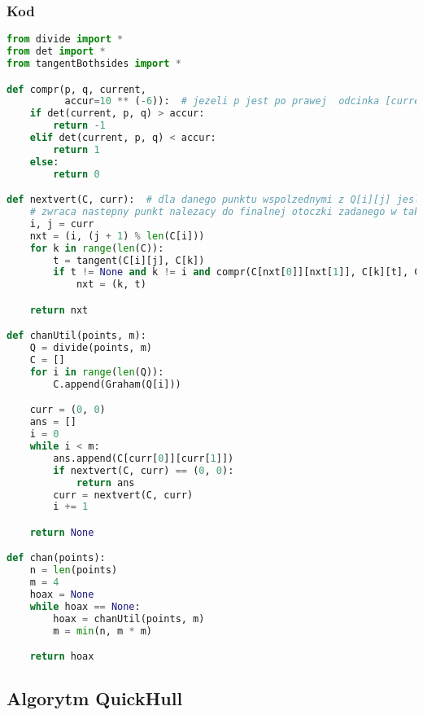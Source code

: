 \documentclass[11pt]{article}
\theoremstyle{remark} \newtheorem{definition}{def.}
\theoremstyle{definition} \newtheorem{twierdzenie}{tw.}
\begin{document}
    \subsubsection{Kod}
\begin{lstlisting}[language=Python]
from divide import *
from det import *
from tangentBothsides import *

def compr(p, q, current,
          accur=10 ** (-6)):  # jezeli p jest po prawej  odcinka [current,q] - jest 'wiekszy', to zwracamy 1
    if det(current, p, q) > accur:
        return -1
    elif det(current, p, q) < accur:
        return 1
    else:
        return 0

def nextvert(C, curr):  # dla danego punktu wspolzednymi z Q[i][j] jesli jest to punkt nalezacy do finalnej otoczki, to
    # zwraca nastepny punkt nalezacy do finalnej otoczki zadanego w takich samych wspolzednych Q[nxt[0]][nxt[1]]
    i, j = curr
    nxt = (i, (j + 1) % len(C[i]))
    for k in range(len(C)):
        t = tangent(C[i][j], C[k])
        if t != None and k != i and compr(C[nxt[0]][nxt[1]], C[k][t], C[i][j]) > 0 and (k, t) != (curr):
            nxt = (k, t)

    return nxt

def chanUtil(points, m):
    Q = divide(points, m)
    C = []
    for i in range(len(Q)):
        C.append(Graham(Q[i]))

    curr = (0, 0)
    ans = []
    i = 0
    while i < m:
        ans.append(C[curr[0]][curr[1]])
        if nextvert(C, curr) == (0, 0):
            return ans
        curr = nextvert(C, curr)
        i += 1

    return None

def chan(points):
    n = len(points)
    m = 4
    hoax = None
    while hoax == None:
        hoax = chanUtil(points, m)
        m = min(n, m * m)

    return hoax
\end{lstlisting}
    

\subsection{Algorytm QuickHull}
\end{document}
